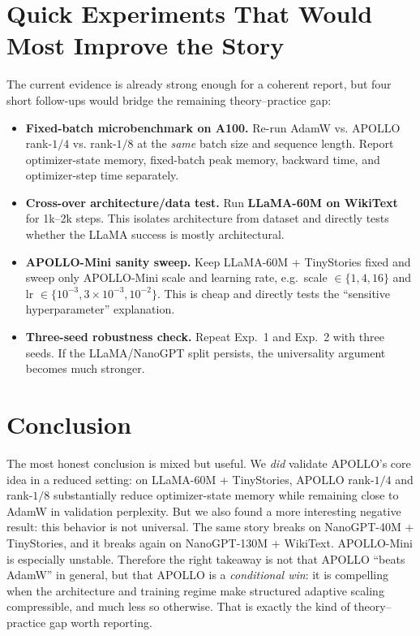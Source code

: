 \documentclass[10pt]{article}
\begin{document}
\section{Quick Experiments That Would Most Improve the Story}
The current evidence is already strong enough for a coherent report, but four short follow-ups would bridge the remaining theory--practice gap:
\begin{itemize}
  \item \textbf{Fixed-batch microbenchmark on A100.} Re-run AdamW vs. APOLLO rank-$1/4$ vs. rank-$1/8$ at the \emph{same} batch size and sequence length. Report optimizer-state memory, fixed-batch peak memory, backward time, and optimizer-step time separately.
  \item \textbf{Cross-over architecture/data test.} Run \textbf{LLaMA-60M on WikiText} for 1k--2k steps. This isolates architecture from dataset and directly tests whether the LLaMA success is mostly architectural.
  \item \textbf{APOLLO-Mini sanity sweep.} Keep LLaMA-60M + TinyStories fixed and sweep only APOLLO-Mini scale and learning rate, e.g.\ scale $\in \{1,4,16\}$ and lr $\in \{10^{-3}, 3\times 10^{-3}, 10^{-2}\}$. This is cheap and directly tests the ``sensitive hyperparameter'' explanation.
  \item \textbf{Three-seed robustness check.} Repeat Exp.~1 and Exp.~2 with three seeds. If the LLaMA/NanoGPT split persists, the universality argument becomes much stronger.
\end{itemize}

\section{Conclusion}
The most honest conclusion is mixed but useful. We \emph{did} validate APOLLO's core idea in a reduced setting: on LLaMA-60M + TinyStories, APOLLO rank-$1/4$ and rank-$1/8$ substantially reduce optimizer-state memory while remaining close to AdamW in validation perplexity. But we also found a more interesting negative result: this behavior is not universal. The same story breaks on NanoGPT-40M + TinyStories, and it breaks again on NanoGPT-130M + WikiText. APOLLO-Mini is especially unstable. Therefore the right takeaway is not that APOLLO ``beats AdamW'' in general, but that APOLLO is a \emph{conditional win}: it is compelling when the architecture and training regime make structured adaptive scaling compressible, and much less so otherwise. That is exactly the kind of theory--practice gap worth reporting.
\end{document}
